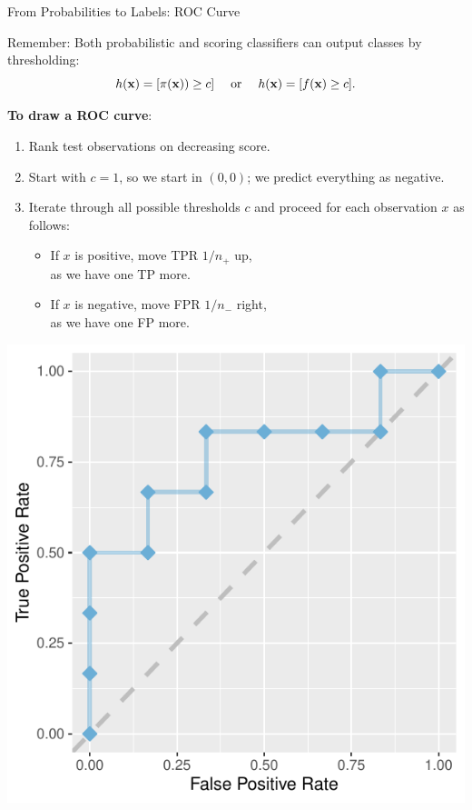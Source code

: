 \begin{vbframe}{From Probabilities to Labels: ROC Curve}

Remember: Both probabilistic and scoring classifiers can output classes by 
thresholding:
$$h(\mathbf{x}) = [\pi(\mathbf{x})) \ge c] \quad \text{ or } \quad h(\mathbf{x}) = [f(\mathbf{x}) \ge c].$$


\textbf{To draw a ROC curve}:

\lz

\begin{minipage}[b]{0.65\textwidth}
  \footnotesize
  \begin{enumerate}
    \item Rank test observations on decreasing score.
    \item Start with $c = 1$, so we start in $(0, 0)$; we predict everything as
    negative.
    \item Iterate through all possible thresholds $c$ and proceed for each
    observation $x$ as follows:
    \begin{itemize}
      \footnotesize
      \item If $x$ is positive, move TPR $1/n_+$ up, \\as we have one TP more.
      \item If $x$ is negative, move FPR $1/n_-$ right, \\as we have one FP 
      more.
    \end{itemize}
  \end{enumerate}
\end{minipage}%
\begin{minipage}[b]{0.35\textwidth}
  \centering
  \includegraphics[width=\textwidth]{figure/eval_mclass_roc_sp_4}
\end{minipage}

\end{vbframe}


